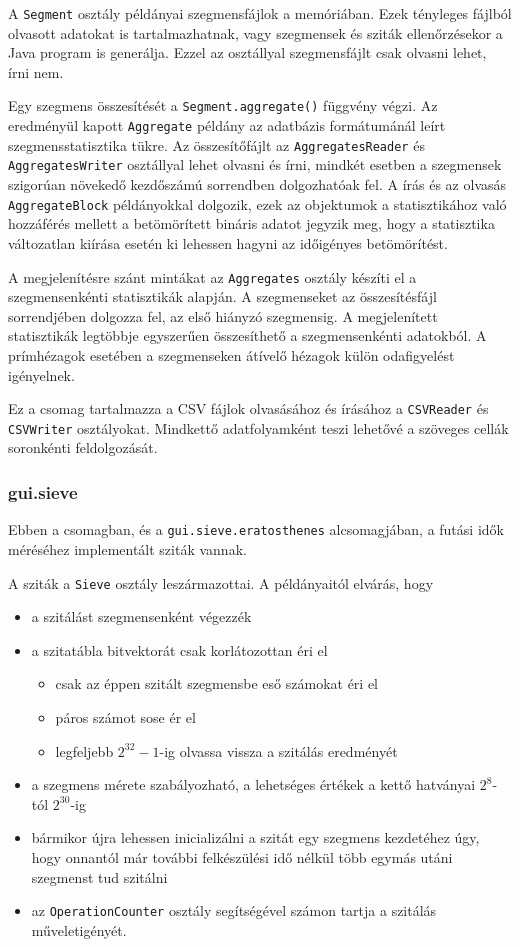 A \texttt{Segment} osztály példányai szegmensfájlok a memóriában.
Ezek tényleges fájlból olvasott adatokat is tartalmazhatnak, vagy szegmensek és sziták ellenőrzésekor a Java program is generálja.
Ezzel az osztállyal szegmensfájlt csak olvasni lehet, írni nem.

Egy szegmens összesítését a \texttt{Segment.aggregate()} függvény végzi.
Az eredményül kapott \texttt{Aggregate} példány az adatbázis formátumánál leírt szegmensstatisztika tükre.
Az összesítőfájlt az \texttt{AggregatesReader} és \texttt{AggregatesWriter} osztállyal lehet olvasni és írni, mindkét esetben a szegmensek szigorúan növekedő kezdőszámú sorrendben dolgozhatóak fel.
A írás és az olvasás \texttt{AggregateBlock} példányokkal dolgozik, ezek az objektumok a statisztikához való hozzáférés mellett a betömörített bináris adatot jegyzik meg, hogy a statisztika változatlan kiírása esetén ki lehessen hagyni az időigényes betömörítést.

A megjelenítésre szánt mintákat az \texttt{Aggregates} osztály készíti el a szegmensenkénti statisztikák alapján.
A szegmenseket az összesítésfájl sorrendjében dolgozza fel, az első hiányzó szegmensig.
A megjelenített statisztikák legtöbbje egyszerűen összesíthető a szegmensenkénti adatokból.
A prímhézagok esetében a szegmenseken átívelő hézagok külön odafigyelést igényelnek.

Ez a csomag tartalmazza a CSV fájlok olvasásához és írásához a \texttt{CSVReader} és \texttt{CSVWriter} osztályokat.
Mindkettő adatfolyamként teszi lehetővé a szöveges cellák soronkénti feldolgozását.

\subsubsection{gui.sieve}

Ebben a csomagban, és a \texttt{gui.sieve.eratosthenes} alcsomagjában, a futási idők méréséhez implementált sziták vannak.

A sziták a \texttt{Sieve} osztály leszármazottai.
A példányaitól elvárás, hogy
\begin{itemize}
\item a szitálást szegmensenként végezzék
\item a szitatábla bitvektorát csak korlátozottan éri el
\begin{itemize}
\item csak az éppen szitált szegmensbe eső számokat éri el
\item páros számot sose ér el
\item legfeljebb $2^{32}-1$-ig olvassa vissza a szitálás eredményét
\end{itemize}
\item a szegmens mérete szabályozható, a lehetséges értékek a kettő hatványai $2^8$-tól $2^{30}$-ig 
\item bármikor újra lehessen inicializálni a szitát egy szegmens kezdetéhez úgy, hogy onnantól már további felkészülési idő nélkül több egymás utáni szegmenst tud szitálni
\item az \texttt{OperationCounter} osztály segítségével számon tartja a szitálás műveletigényét.
\end{itemize}


